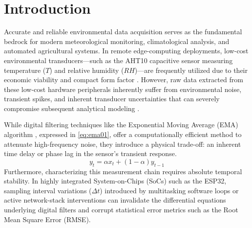 \section{Introduction}
Accurate and reliable environmental data acquisition serves as the fundamental bedrock for modern meteorological monitoring, climatological analysis, and automated agricultural systems. 
In remote edge-computing deployments, low-cost environmental transducers—such as the AHT10 capacitive sensor measuring temperature ($T$) and relative humidity ($RH$)—are frequently utilized due to their economic viability and compact form factor \cite{abdinoor2025lowcost, hanes2024comparison}. 
However, raw data extracted from these low-cost hardware peripherals inherently suffer from environmental noise, transient spikes, and inherent transducer uncertainties that can severely compromise subsequent analytical modeling \cite{aht10_datasheet}.

While digital filtering techniques like the Exponential Moving Average (EMA) algorithm \cite{stoyanova2025ema, blokhin2022digital}, 
expressed in \eqref{eq:ema01}, offer a computationally efficient method to attenuate high-frequency noise, 
they introduce a physical trade-off: an inherent time delay or phase lag in the sensor's transient response.
\begin{equation}
  y_t = \alpha x_t + (1-\alpha)y_{t-1}
  \label{eq:ema01}
\end{equation}
Furthermore, characterizing this measurement chain requires absolute temporal stability. 
In highly integrated System-on-Chips (SoCs) such as the ESP32, sampling interval variations ($\Delta t$) introduced by multitasking software loops or active network-stack interventions 
can invalidate the differential equations underlying digital filters and corrupt statistical error metrics such as the Root Mean Square Error (RMSE).